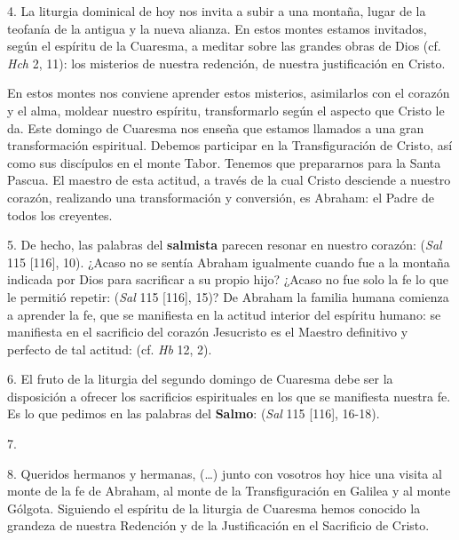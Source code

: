 \begin{body}
4. La liturgia dominical de hoy nos invita a subir a una montaña, lugar de la teofanía de la antigua y la nueva alianza. En estos montes estamos invitados, según el espíritu de la Cuaresma, a meditar sobre las grandes obras de Dios (cf. \textit{Hch} 2, 11): los misterios de nuestra redención, de nuestra justificación en Cristo.

En estos montes nos conviene aprender estos misterios, asimilarlos con el corazón y el alma, moldear nuestro espíritu, transformarlo según el aspecto que Cristo le da. Este domingo de Cuaresma nos enseña que estamos llamados a una gran transformación espiritual. Debemos participar en la Transfiguración de Cristo, así como sus discípulos en el monte Tabor. Tenemos que prepararnos para la Santa Pascua. El maestro de esta actitud, a través de la cual Cristo desciende a nuestro corazón, realizando una transformación y conversión, es Abraham: el Padre de todos los creyentes.

5. De hecho, las palabras del \textbf{salmista} parecen resonar en nuestro corazón:  (\textit{Sal} 115 [116], 10). ¿Acaso no se sentía Abraham igualmente  cuando fue a la montaña indicada por Dios para sacrificar a su propio hijo? ¿Acaso no fue solo la fe lo que le permitió repetir:  (\textit{Sal} 115 [116], 15)? De Abraham la familia humana comienza a aprender la fe, que se manifiesta en la actitud interior del espíritu humano: se manifiesta en el sacrificio del corazón Jesucristo es el Maestro definitivo y perfecto de tal actitud:  (cf. \textit{Hb} 12, 2).

6. El fruto de la liturgia del segundo domingo de Cuaresma debe ser la disposición a ofrecer los sacrificios espirituales en los que se manifiesta nuestra fe. Es lo que pedimos en las palabras del \textbf{Salmo}:  (\textit{Sal} 115 [116], 16-18). 

7.  

8. Queridos hermanos y hermanas, (\ldots) junto con vosotros hoy hice una visita al monte de la fe de Abraham, al monte de la Transfiguración en Galilea y al monte Gólgota. Siguiendo el espíritu de la liturgia de Cuaresma hemos conocido la grandeza de nuestra Redención y de la Justificación en el Sacrificio de Cristo.


\end{body}

